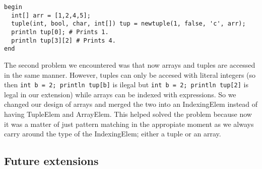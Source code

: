 \documentclass{article}
\begin{document}
\begin{lstlisting}
begin
  int[] arr = [1,2,4,5];
  tuple(int, bool, char, int[]) tup = newtuple(1, false, 'c', arr);
  println tup[0]; # Prints 1.
  println tup[3][2] # Prints 4.
end
\end{lstlisting}

The second problem we encountered was that now arrays and tuples are accessed in the same manner. However, tuples can only be accesed with literal integers (so
then \texttt{int b = 2; println tup[b]} is ilegal but \texttt{int b = 2; println tup[2]} is legal in our extension) while arrays can be indexed with expressions. So we changed our design of arrays and merged the two into an IndexingElem instead of having TupleElem and ArrayElem. This helped solved the problem because now it was a matter of just pattern matching in the appropiate moment as we always carry around the type of the IndexingElem; either a tuple or an array.

\subsection{Future extensions}
\end{document}
